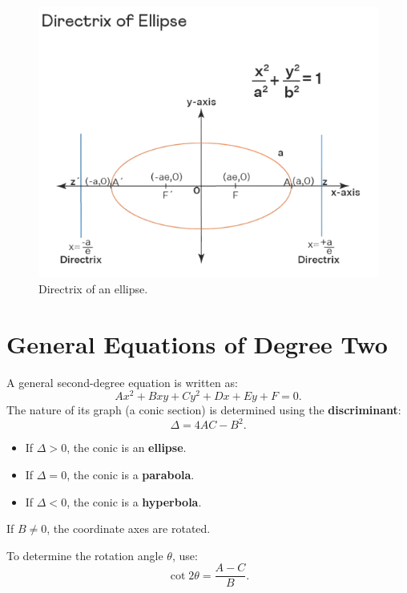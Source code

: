 \documentclass{article}
\begin{document}
\begin{illustrationbox}
\begin{figure}[H]
        \vspace{1em} %
        
        \begin{minipage}{0.6\textwidth}
            \centering
            \includegraphics[width=\linewidth]{ellipse directrix.png}
            \caption{Directrix of an ellipse.}
        \end{minipage}
    \end{figure}    
\end{illustrationbox}

\section*{General Equations of Degree Two}

\begin{conceptbox}
A general second-degree equation is written as:
\[
Ax^2 + Bxy + Cy^2 + Dx + Ey + F = 0.
\]
The nature of its graph (a conic section) is determined using the \textbf{discriminant}:
\[
\Delta = 4AC - B^2.
\]
\begin{itemize}
    \item If \( \Delta > 0 \), the conic is an \textbf{ellipse}.
    \item If \( \Delta = 0 \), the conic is a \textbf{parabola}.
    \item If \( \Delta < 0 \), the conic is a \textbf{hyperbola}.
\end{itemize}
\begin{remarkbox}
    If \( B \neq 0 \), the coordinate axes are rotated.

    To determine the rotation angle \( \theta \), use:
    \[
    \cot 2\theta = \frac{A - C}{B}.
    \]
\end{remarkbox}
\end{conceptbox}
\end{document}

